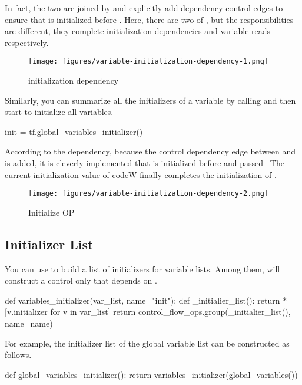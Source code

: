 \begin{content}
In fact, the two are joined by  and explicitly add dependency control edges to ensure that  is initialized before . Here, there are two  of , but the responsibilities are different, they complete initialization dependencies and variable reads respectively.


\begin{figure}[!h]
  \centering
  \texttt{[image: figures/variable-initialization-dependency-1.png]}
  \caption{initialization dependency}
  \label{fig:variable-initialization-dependency-1}
\end{figure}

Similarly, you can summarize all the initializers of a variable by calling  and then start  to initialize all variables.

\begin{leftbar}
\begin{python}
init = tf.global_variables_initializer()
\end{python}
\end{leftbar}

According to the dependency, because the control dependency edge between  and  is added, it is cleverly implemented that  is initialized before  and passed \ The current initialization value of code{W} finally completes the initialization of .

\begin{figure}[!h]
  \centering
  \texttt{[image: figures/variable-initialization-dependency-2.png]}
  \caption{Initialize OP}
  \label{fig:variable-initialization-dependency-2}
\end{figure}


\subsection{Initializer List}
You can use  to build a list of initializers for variable lists. Among them,  will construct a control only  that depends on .

\begin{leftbar}
\begin{python}
def variables_initializer(var_list, name="init"):
  def _initialier_list():
    return *[v.initializer for v in var_list]
  return control_flow_ops.group(_initialier_list(), name=name)
\end{python}
\end{leftbar}

For example, the initializer list of the global variable list can be constructed as follows.

\begin{leftbar}
\begin{python}
def global_variables_initializer():
  return variables_initializer(global_variables())
\end{python}
\end{leftbar}

\end{content}


